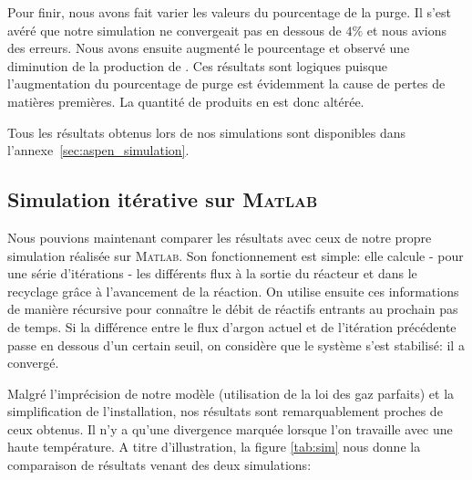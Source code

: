 Pour finir, nous avons fait varier les valeurs du pourcentage de la purge.
Il s'est avéré que notre simulation ne convergeait pas en dessous de $4\%$ 
et nous avions des erreurs.
Nous avons ensuite augmenté le pourcentage 
et observé une diminution de la production de . 
Ces résultats sont logiques puisque l'augmentation du pourcentage 
de purge est évidemment la cause de pertes de matières premières. 
La quantité de produits en est donc altérée.

Tous les résultats obtenus lors de nos simulations 
sont disponibles dans l'annexe~\ref{sec:aspen_simulation}.

\subsection{Simulation itérative sur \textsc{Matlab}}

Nous pouvions maintenant comparer les résultats
avec ceux de notre propre simulation réalisée sur
\textsc{Matlab}. Son fonctionnement est simple:
elle calcule - pour une série d'itérations - 
les différents flux à la sortie du réacteur 
et dans le recyclage grâce à l'avancement de
la réaction. On utilise ensuite ces informations 
de manière récursive pour connaître le débit de 
réactifs entrants au prochain pas de temps. Si 
la différence entre le flux d'argon actuel et 
de l'itération précédente passe en dessous d'un 
certain seuil, on considère que le système s'est 
stabilisé: il a convergé.

Malgré l'imprécision de notre modèle (utilisation
de la loi des gaz parfaits) et la simplification
de l'installation, nos résultats sont 
remarquablement proches de ceux obtenus. Il n'y
a qu'une divergence marquée lorsque l'on travaille 
avec une haute température. A titre d'illustration, 
la figure \ref{tab:sim} nous donne la comparaison 
de résultats venant des deux simulations:

